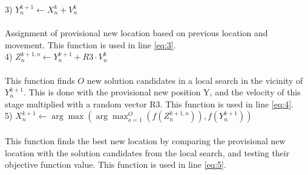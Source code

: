 \documentclass[runningheads]{llncs}
\begin{document}
3) $
Y_n^{k+1} \leftarrow X_n^k + V_n^k
$ \\ \\
Assignment of provisional new location based on previous location and movement. This function is used in line \ref{eq:3}. \\ 

4) $
Z_n^{k+1, o} \leftarrow Y_n^{k+1} + R3 \cdot V_n^{k}
$ \\ \\
This function finds $O$ new solution candidates in a local search in the vicinity of $Y_n^{k+1}$. This is done with the provisional new position Y, and the velocity of this stage multiplied with a random vector R3. This function is used in line \ref{eq:4}.\\

5) $
X_n^{k+1} \leftarrow \arg \max (\arg \max_{o=1}^O(f(Z_n^{k+1, o})),f(Y_n^{k+1}))
$ \\ \\
This function finds the best new location by comparing the provisional new location with the solution candidates from the local search, and testing their objective function value. This function is used in line \ref{eq:5}.


\end{document}
